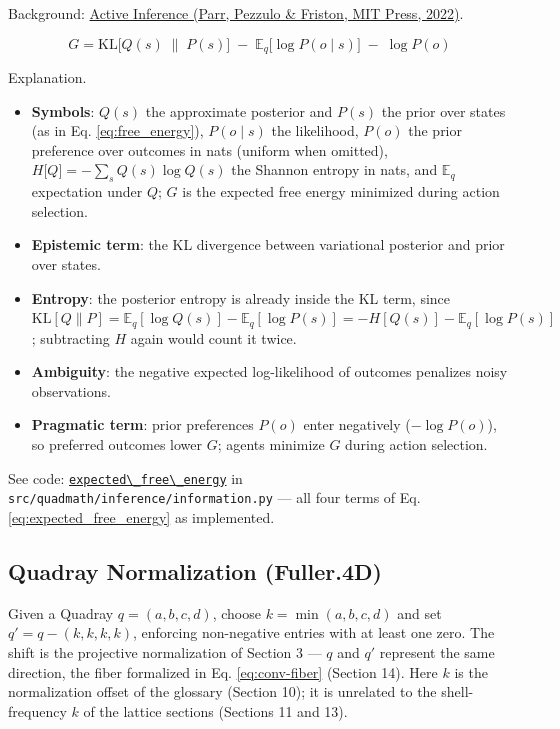 \documentclass[
  10pt,
]{article}
\newcommand{\passthrough}[1]{#1}
\providecommand{\tightlist}{%
  \setlength{\itemsep}{0pt}\setlength{\parskip}{0pt}}
\begin{document}
Background:
\href{https://direct.mit.edu/books/oa-monograph/5299/Active-InferenceThe-Free-Energy-Principle-in-Mind}{Active
Inference (Parr, Pezzulo \& Friston, MIT Press, 2022)}.

\begin{equation}\label{eq:expected_free_energy}
G = \mathrm{KL}\big[ Q(s)\;\|\;P(s) \big] \;-\; \mathbb{E}_{q}\big[\log P(o\mid s)\big] \;-\; \log P(o)
\end{equation}

Explanation.

\begin{itemize}
\tightlist
\item
  \textbf{Symbols}: \(Q(s)\) the approximate posterior and \(P(s)\) the
  prior over states (as in Eq. \eqref{eq:free_energy}), \(P(o \mid s)\)
  the likelihood, \(P(o)\) the prior preference over outcomes in nats
  (uniform when omitted), \(H\big[Q\big] = -\sum_s Q(s) \log Q(s)\) the
  Shannon entropy in nats, and \(\mathbb{E}_q\) expectation under \(Q\);
  \(G\) is the expected free energy minimized during action selection.
\item
  \textbf{Epistemic term}: the KL divergence between variational
  posterior and prior over states.
\item
  \textbf{Entropy}: the posterior entropy is already inside the KL term,
  since
  \(\mathrm{KL}[Q\|P] = \mathbb{E}_q[\log Q(s)] - \mathbb{E}_q[\log P(s)] = -H[Q(s)] - \mathbb{E}_q[\log P(s)]\);
  subtracting \(H\) again would count it twice.
\item
  \textbf{Ambiguity}: the negative expected log-likelihood of outcomes
  penalizes noisy observations.
\item
  \textbf{Pragmatic term}: prior preferences \(P(o)\) enter negatively
  (\(-\log P(o)\)), so preferred outcomes lower \(G\); agents minimize
  \(G\) during action selection.
\end{itemize}

See code:
\href{03_quadray_methods.md\#code:expected_free_energy}{\passthrough{\lstinline!expected\_free\_energy!}}
in \passthrough{\lstinline!src/quadmath/inference/information.py!} ---
all four terms of Eq. \eqref{eq:expected_free_energy} as implemented.

\subsection{Quadray Normalization
(Fuller.4D)}\label{quadray-normalization-fuller.4d}

Given a Quadray \(q = (a, b, c, d)\), choose \(k = \min(a, b, c, d)\)
and set \(q' = q - (k, k, k, k)\), enforcing non-negative entries with
at least one zero. The shift is the projective normalization of Section
3 --- \(q\) and \(q'\) represent the same direction, the fiber
formalized in Eq. \eqref{eq:conv-fiber} (Section 14). Here \(k\) is the
normalization offset of the glossary (Section 10); it is unrelated to
the shell-frequency \(k\) of the lattice sections (Sections 11 and 13).
\end{document}

